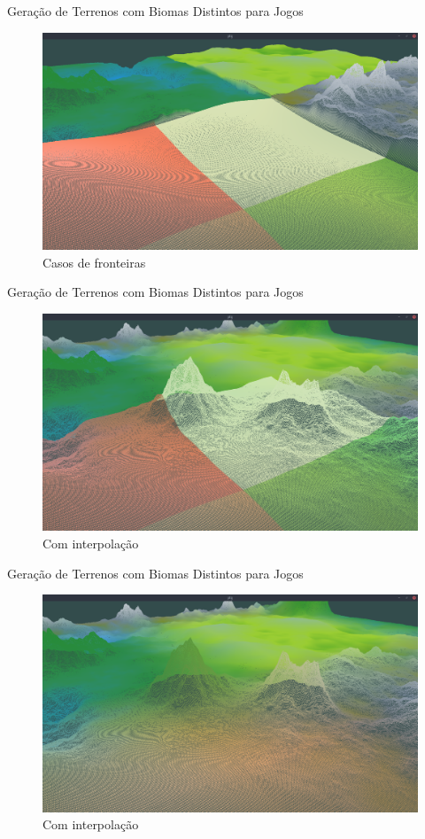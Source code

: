 \begin{frame}{Geração de Terrenos com Biomas Distintos para Jogos}
  \begin{figure}
		\centering
        \includegraphics[width=.8\textwidth]
        {img/uffs/interpolationArea/showareanotinterpo.png}
        \caption{Casos de fronteiras}
  \end{figure}
\end{frame}

\begin{frame}{Geração de Terrenos com Biomas Distintos para Jogos}
  \begin{figure}
		\centering
        \includegraphics[width=.8\textwidth]
        {img/uffs/interpolationArea/showareainterpolating.png}
        \caption{Com interpolação}
  \end{figure}
\end{frame}

\begin{frame}{Geração de Terrenos com Biomas Distintos para Jogos}
  \begin{figure}
		\centering
        \includegraphics[width=.8\textwidth]{img/uffs/interpolationArea/interpolation.png}
        \caption{Com interpolação}
  \end{figure}
\end{frame}





